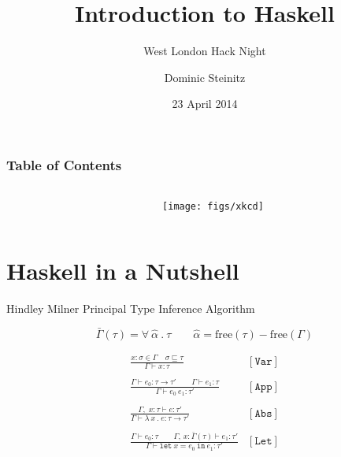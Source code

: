 \documentclass{beamer}
\begin{document}

\title{Introduction to Haskell}
\subtitle{West London Hack Night}
\author{Dominic Steinitz}

\date{23 April 2014}

\maketitle

\begin{frame}
  \frametitle{Table of Contents}
  \begin{columns}[]
   \begin{column}[]{5cm}
    \tableofcontents[]
   \end{column}
   \begin{column}[]{5cm}
    \texttt{[image: figs/xkcd]}
   \end{column}
  \end{columns}
\end{frame}

\section{Haskell in a Nutshell}

\begin{frame}{Hindley Milner Principal Type Inference Algorithm}

$$
\bar{\Gamma}(\tau) = \forall\ \hat{\alpha}\ .\ \tau \quad\quad \hat{\alpha} = \textrm{free}(\tau) - \textrm{free}(\Gamma)
$$

$$
\begin{array}{cl}
\displaystyle\frac{x:\sigma \in \Gamma \quad \sigma \sqsubseteq \tau}{\Gamma \vdash x:\tau}&[\mathtt{Var}]\\ \\
\displaystyle\frac{\Gamma \vdash e_0:\tau \rightarrow \tau' \quad\quad \Gamma \vdash e_1 : \tau }{\Gamma \vdash e_0\ e_1 : \tau'}&[\mathtt{App}]\\ \\
\displaystyle\frac{\Gamma,\;x:\tau\vdash e:\tau'}{\Gamma \vdash \lambda\ x\ .\ e : \tau \rightarrow \tau'}&[\mathtt{Abs}]\\ \\
\displaystyle\frac{\Gamma \vdash e_0:\tau \quad\quad \Gamma,\,x:\bar{\Gamma}(\tau) \vdash e_1:\tau'}{\Gamma \vdash \mathtt{let}\ x = e_0\ \mathtt{in}\ e_1 :  \tau'}&[\mathtt{Let}]
\end{array}
$$

\end{frame}
\end{document}
